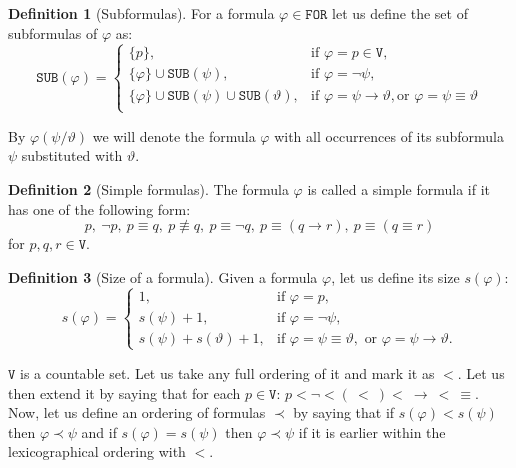 \documentclass{article}
\theoremstyle{definition}
\newtheorem{definition}{Definition}[section]
\theoremstyle{definition}
\theoremstyle{definition}
\newcommand*{\id}{\equiv}
\newcommand*{\ra}{\rightarrow}
\newcommand*{\V}{\texttt{V}}
\newcommand*{\FOR}{\texttt{FOR}}
\newcommand*{\SUB}{\texttt{SUB}}
\begin{document}
\begin{definition}[Subformulas]
    For a formula $\varphi \in \FOR$ let us define the set of subformulas of $\varphi$ as:
    $$
        \SUB(\varphi) = \begin{cases}
            \{p\},                                            & \text{if } \varphi = p \in \V,                                                   \\
            \{\varphi\} \cup \SUB(\psi),                      & \text{if } \varphi = \lnot \psi,                                                 \\
            \{\varphi\} \cup \SUB(\psi) \cup \SUB(\vartheta), & \text{if } \varphi = \psi \ra \vartheta, \text{or } \varphi = \psi \id \vartheta \\
        \end{cases}
    $$
\end{definition}
By $\varphi(\psi / \vartheta)$ we will denote the formula $\varphi$ with all
occurrences of its subformula $\psi$ substituted with $\vartheta$.

\begin{definition}[Simple formulas]
    The formula $\varphi$ is called a simple formula if it has one of the following form:
    $$
        p,\ \lnot p,\ p \id q,\ p \not \id q,\ p \id \lnot q,\ p \id (q \ra r),\ p \id (q \id r)
    $$
    for $p, q, r \in \V$.
\end{definition}

\begin{definition}[Size of a formula]
    Given a formula $\varphi$, let us define its size $s(\varphi)$:
    $$
        s(\varphi) = \begin{cases}
            1,                          & \text{if } \varphi = p,                                                                      \\
            s(\psi) + 1,                & \text{if } \varphi = \lnot \psi,                                                             \\
            s(\psi) + s(\vartheta) + 1, & \text{if } \varphi = \psi \equiv \vartheta,\text{ or } \varphi = \psi \rightarrow \vartheta.
        \end{cases}
    $$
\end{definition}
$\V$ is a countable set. Let us take any full ordering of it and mark it as $<$. Let us then
extend it by saying that for each $p \in \V$: $p < \lnot <\xspace (\ < \ )\xspace<\ \ra\ <\ \id$. Now,
let us define an ordering of formulas $\prec$ by saying that if $s(\varphi) < s(\psi)$ then $\varphi \prec \psi$ and if $s(\varphi) = s(\psi)$ then $\varphi \prec \psi$ if it is earlier within the lexicographical ordering
with $<$.
\end{document}

